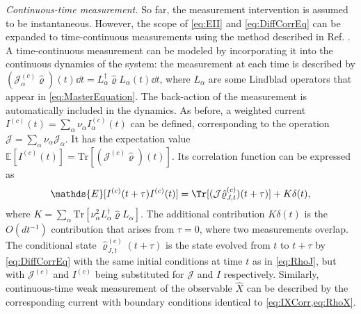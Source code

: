 \documentclass[
    11pt,
    letterpaper,
    reprint,
    notitlepage,
    superscriptaddress,
    aps,prx
]{revtex4-2}
\renewcommand{\mathbb}{\mathds}	%
\renewcommand{\t}[1]{\mathrm{#1}}
\renewcommand{\rho}{\varrho}
\newcommand{\EE}{\mathbb{E}}
\begin{document}
\emph{Continuous-time measurement.}
So far, the measurement intervention is assumed to be instantaneous. 
However, the scope of \cref{eq:EII} and \cref{eq:DiffCorrEq} can be expanded to 
time-continuous measurements using the method described in Ref. \cite{Landi2024}.
A time-continuous measurement can be modeled by incorporating it into the continuous dynamics of the
system: the measurement at each time is described by $(\mathcal J_\alpha^{(c)} \hat \rho)(t) \dd{t} 
= L_\alpha^\dagger \hat \rho L_\alpha (t) \dd{t}$, where $L_\alpha$ are some Lindblad operators 
that appear in \cref{eq:MasterEquation}. 
The back-action of the measurement is automatically included in the dynamics.
As before, a weighted current $I^{(c)}(t) = \sum_\alpha \nu_\alpha I_\alpha^{(c)}(t)$ can be defined, 
corresponding to the operation $\mathcal J = \sum_\alpha \nu_\alpha \mathcal J_\alpha$. 
It has the expectation value $\EE[I^{(c)}(t)] = \t{Tr}[(\mathcal J^{(c)} \hat \rho)(t)] $. 
Its correlation function can be expressed as
\begin{equation}\label{eq:ContMeasurement}
	\EE[I^{(c)}(t+\tau)I^{(c)}(t)] = \Tr[(\mathcal J \hat \rho_{J, t}^{(c)})(t+\tau)] + K \delta(t),
\end{equation}
where $K = \sum_\alpha \t{Tr}[\nu_\alpha^2 L_\alpha^\dagger \hat \rho L_\alpha]$.
The additional contribution $K \delta(t)$ is the $O(dt^{-1})$ contribution that arises 
from $\tau = 0$, where two measurements overlap.
The conditional state $\hat \rho_{J, t}^{(c)}(t+ \tau)$ is the state evolved from $t$ to $t+ \tau$ by \cref{eq:DiffCorrEq} with the same initial conditions at time $t$ as in \cref{eq:RhoJ}, but with $\mathcal J^{(c)}$ and $I^{(c)}$ being substituted for $\mathcal J$ and $I$ respectively.
Similarly, continuous-time weak measurement of the observable $\hat X$ can be described by the corresponding current with boundary conditions identical to \cref{eq:IXCorr,eq:RhoX}.
\end{document}
